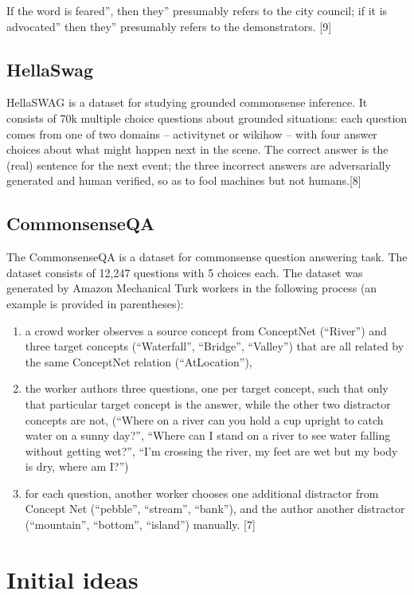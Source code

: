 \documentclass{article}
\begin{document}
If the word is feared'', then they'' presumably refers to the city council; if it is advocated'' then they'' presumably refers to the demonstrators. [9]

\subsection{HellaSwag}
HellaSWAG is a dataset for studying grounded commonsense inference. It consists of 70k multiple choice questions about grounded situations: each question comes from one of two domains -- activitynet or wikihow -- with four answer choices about what might happen next in the scene. The correct answer is the (real) sentence for the next event; the three incorrect answers are adversarially generated and human verified, so as to fool machines but not humans.[8]

\subsection{CommonsenseQA}
The CommonsenseQA is a dataset for commonsense question answering task. The dataset consists of 12,247 questions with 5 choices each. The dataset was generated by Amazon Mechanical Turk workers in the following process (an example is provided in parentheses):

\begin{enumerate}
    \item a crowd worker observes a source concept from ConceptNet (“River”) and three target concepts (“Waterfall”, “Bridge”, “Valley”) that are all related by the same ConceptNet relation (“AtLocation”),
    \item the worker authors three questions, one per target concept, such that only that particular target concept is the answer, while the other two distractor concepts are not, (“Where on a river can you hold a cup upright to catch water on a sunny day?”, “Where can I stand on a river to see water falling without getting wet?”, “I’m crossing the river, my feet are wet but my body is dry, where am I?”)
    \item for each question, another worker chooses one additional distractor from Concept Net (“pebble”, “stream”, “bank”), and the author another distractor (“mountain”, “bottom”, “island”) manually. [7]


\end{enumerate}


\section{Initial ideas}
\end{document}
